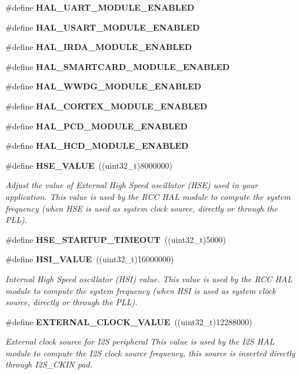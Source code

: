 \begin{DoxyCompactItemize}
\item 
\#define \textbf{ H\+A\+L\+\_\+\+U\+A\+R\+T\+\_\+\+M\+O\+D\+U\+L\+E\+\_\+\+E\+N\+A\+B\+L\+ED}
\item 
\#define \textbf{ H\+A\+L\+\_\+\+U\+S\+A\+R\+T\+\_\+\+M\+O\+D\+U\+L\+E\+\_\+\+E\+N\+A\+B\+L\+ED}
\item 
\#define \textbf{ H\+A\+L\+\_\+\+I\+R\+D\+A\+\_\+\+M\+O\+D\+U\+L\+E\+\_\+\+E\+N\+A\+B\+L\+ED}
\item 
\#define \textbf{ H\+A\+L\+\_\+\+S\+M\+A\+R\+T\+C\+A\+R\+D\+\_\+\+M\+O\+D\+U\+L\+E\+\_\+\+E\+N\+A\+B\+L\+ED}
\item 
\#define \textbf{ H\+A\+L\+\_\+\+W\+W\+D\+G\+\_\+\+M\+O\+D\+U\+L\+E\+\_\+\+E\+N\+A\+B\+L\+ED}
\item 
\#define \textbf{ H\+A\+L\+\_\+\+C\+O\+R\+T\+E\+X\+\_\+\+M\+O\+D\+U\+L\+E\+\_\+\+E\+N\+A\+B\+L\+ED}
\item 
\#define \textbf{ H\+A\+L\+\_\+\+P\+C\+D\+\_\+\+M\+O\+D\+U\+L\+E\+\_\+\+E\+N\+A\+B\+L\+ED}
\item 
\#define \textbf{ H\+A\+L\+\_\+\+H\+C\+D\+\_\+\+M\+O\+D\+U\+L\+E\+\_\+\+E\+N\+A\+B\+L\+ED}
\item 
\#define \textbf{ H\+S\+E\+\_\+\+V\+A\+L\+UE}~((uint32\+\_\+t)8000000)
\begin{DoxyCompactList}\small\item\em Adjust the value of External High Speed oscillator (H\+SE) used in your application. This value is used by the R\+CC H\+AL module to compute the system frequency (when H\+SE is used as system clock source, directly or through the P\+LL). \end{DoxyCompactList}\item 
\#define \textbf{ H\+S\+E\+\_\+\+S\+T\+A\+R\+T\+U\+P\+\_\+\+T\+I\+M\+E\+O\+UT}~((uint32\+\_\+t)5000)
\item 
\#define \textbf{ H\+S\+I\+\_\+\+V\+A\+L\+UE}~((uint32\+\_\+t)16000000)
\begin{DoxyCompactList}\small\item\em Internal High Speed oscillator (H\+SI) value. This value is used by the R\+CC H\+AL module to compute the system frequency (when H\+SI is used as system clock source, directly or through the P\+LL). \end{DoxyCompactList}\item 
\#define \textbf{ E\+X\+T\+E\+R\+N\+A\+L\+\_\+\+C\+L\+O\+C\+K\+\_\+\+V\+A\+L\+UE}~((uint32\+\_\+t)12288000)
\begin{DoxyCompactList}\small\item\em External clock source for I2S peripheral This value is used by the I2S H\+AL module to compute the I2S clock source frequency, this source is inserted directly through I2\+S\+\_\+\+C\+K\+IN pad. \end{DoxyCompactList}\item 

\end{DoxyCompactItemize}
